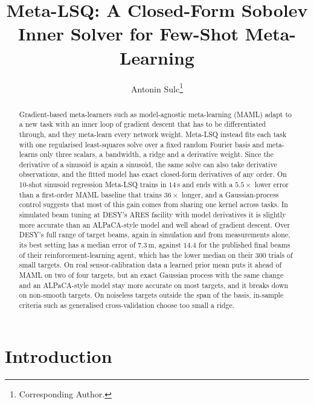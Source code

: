 \documentclass[fullpaper,final]{nldl}
\title{Meta-LSQ: A Closed-Form Sobolev Inner Solver for Few-Shot Meta-Learning}
\author[1]{Antonin Sulc\thanks{Corresponding Author.}}
\affil[1]{Lawrence Berkeley National Laboratory}
\affil[ ]{\texttt{asulc@lbl.gov}}
\theoremstyle{plain}
\theoremstyle{definition}
\begin{document}
\maketitle

\begin{abstract}
Gradient-based meta-learners such as model-agnostic meta-learning (MAML) adapt to a new task with an inner loop of
gradient descent that has to be differentiated through, and they meta-learn every
network weight. Meta-LSQ instead fits each task with one regularised least-squares
solve over a fixed random Fourier basis and meta-learns only three scalars, a
bandwidth, a ridge and a derivative weight. Since the derivative of a sinusoid is
again a sinusoid, the same solve can also take derivative observations, and the
fitted model has exact closed-form derivatives of any order. On 10-shot sinusoid
regression Meta-LSQ trains in $14$\,s and ends with a $5.5\times$ lower error than a
first-order MAML baseline that trains $36\times$ longer, and a Gaussian-process
control suggests that most
of this gain comes from sharing one kernel across tasks. In simulated beam tuning at
DESY's ARES facility with model derivatives it is slightly more accurate than an
ALPaCA-style model and well ahead of gradient descent.
Over DESY's full range of target beams, again in simulation and from measurements
alone, its best setting has a median error of $7.3$\,\textmu m, against $14.4$ for
the published final beams of their reinforcement-learning agent, which has the
lower median on their 300 trials of small targets. On real sensor-calibration data a learned prior mean puts
it ahead of MAML on two of four targets, but an exact Gaussian process with the same
change and an ALPaCA-style model stay more accurate on most targets, and it breaks
down on non-smooth targets. On
noiseless targets outside the span of the basis, in-sample criteria such as
generalised cross-validation choose too small a ridge.
\end{abstract}

\section{Introduction}
\label{sec:intro}
\end{document}
